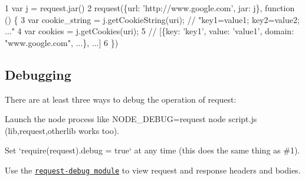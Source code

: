 \begin{DoxyCode}
1 var j = request.jar() 
2 request(\{url: 'http://www.google.com', jar: j\}, function () \{
3   var cookie\_string = j.getCookieString(uri); // "key1=value1; key2=value2; ..."
4   var cookies = j.getCookies(uri); 
5   // [\{key: 'key1', value: 'value1', domain: "www.google.com", ...\}, ...]
6 \})
\end{DoxyCode}


\subsection*{Debugging}

There are at least three ways to debug the operation of {\ttfamily request}\+:


\begin{DoxyEnumerate}
\item Launch the node process like {\ttfamily N\+O\+D\+E\+\_\+\+D\+E\+B\+U\+G=request node script.\+js} ({\ttfamily lib,request,otherlib} works too).
\item Set `require(\textquotesingle{}request\textquotesingle{}).debug = true` at any time (this does the same thing as \#1).
\item Use the \href{https://github.com/nylen/request-debug}{\tt request-\/debug module} to view request and response headers and bodies. 
\end{DoxyEnumerate}
